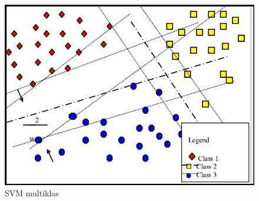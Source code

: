 \begin{figure} [ht] \centering
  \includegraphics[scale=0.35]{gambar/SVM.png}
  \caption{SVM multiklas}
  \label{fig:SVM}
\end{figure}

